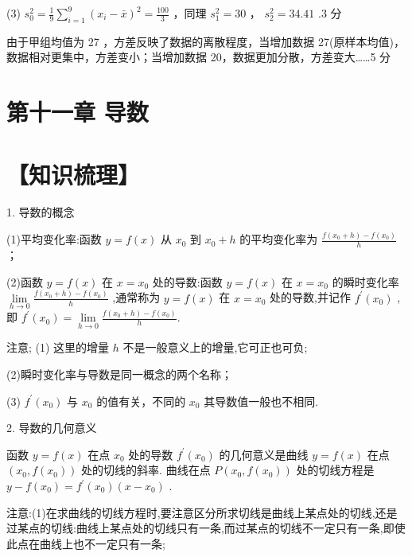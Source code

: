 \documentclass[10pt]{article}
\begin{document}
(3) \({s}_{0}^{2} = \frac{1}{9}\mathop{\sum }\limits_{{i = 1}}^{9}{\left( {x}_{i} - \bar{x}\right) }^{2} = \frac{100}{3}\) ，同理 \({s}_{1}^{2} = {30}\) ， \({s}_{2}^{2} = {34.41}\) .3 分

由于甲组均值为 27 ，方差反映了数据的离散程度，当增加数据 27(原样本均值)， 数据相对更集中，方差变小；当增加数据 20，数据更加分散，方差变大……5 分

\section*{第十一章 导数}

\section*{【知识梳理】}

1. 导数的概念

(1)平均变化率:函数 \(y = f\left( x\right)\) 从 \({x}_{0}\) 到 \({x}_{0} + h\) 的平均变化率为 \(\frac{f\left( {{x}_{0} + h}\right)  - f\left( {x}_{0}\right) }{h}\) ；

(2)函数 \(y = f\left( x\right)\) 在 \(x = {x}_{0}\) 处的导数:函数 \(y = f\left( x\right)\) 在 \(x = {x}_{0}\) 的瞬时变化率 \(\mathop{\lim }\limits_{{h \rightarrow  0}}\frac{f\left( {{x}_{0} + h}\right)  - f\left( {x}_{0}\right) }{h}\) ,通常称为 \(y = f\left( x\right)\) 在 \(x = {x}_{0}\) 处的导数,并记作 \({f}^{\prime }\left( {x}_{0}\right)\) ,即 \({f}^{\prime }\left( {x}_{0}\right)  = \mathop{\lim }\limits_{{h \rightarrow  0}}\frac{f\left( {{x}_{0} + h}\right)  - f\left( {x}_{0}\right) }{h}.\)

注意; (1) 这里的增量 \(h\) 不是一般意义上的增量,它可正也可负;

(2)瞬时变化率与导数是同一概念的两个名称；

(3) \({f}^{\prime }\left( {x}_{0}\right)\) 与 \({x}_{0}\) 的值有关，不同的 \({x}_{0}\) 其导数值一般也不相同.

2. 导数的几何意义

函数 \(y = f\left( x\right)\) 在点 \({x}_{0}\) 处的导数 \({f}^{\prime }\left( {x}_{0}\right)\) 的几何意义是曲线 \(y = f\left( x\right)\) 在点 \(\left( {{x}_{0},f\left( {x}_{0}\right) }\right)\) 处的切线的斜率. 曲线在点 \(P\left( {{x}_{0},f\left( {x}_{0}\right) }\right)\) 处的切线方程是 \(y - f\left( {x}_{0}\right)  = {f}^{\prime }\left( {x}_{0}\right) \left( {x - {x}_{0}}\right)\) .

注意:(1)在求曲线的切线方程时,要注意区分所求切线是曲线上某点处的切线,还是过某点的切线:曲线上某点处的切线只有一条,而过某点的切线不一定只有一条,即使此点在曲线上也不一定只有一条;
\end{document}
